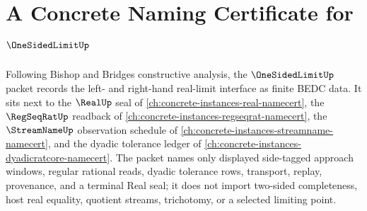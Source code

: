 \chapter{A Concrete Naming Certificate for $\OneSidedLimitUp$}
\label{ch:concrete-instances-one-sided-limit-namecert}

Following Bishop and Bridges constructive analysis, the $\OneSidedLimitUp$ packet records the left- and right-hand real-limit interface as finite BEDC data. It sits next to the $\RealUp$ seal of \autoref{ch:concrete-instances-real-namecert}, the $\RegSeqRatUp$ readback of \autoref{ch:concrete-instances-regseqrat-namecert}, the $\StreamNameUp$ observation schedule of \autoref{ch:concrete-instances-streamname-namecert}, and the dyadic tolerance ledger of \autoref{ch:concrete-instances-dyadicratcore-namecert}. The packet names only displayed side-tagged approach windows, regular rational reads, dyadic tolerance rows, transport, replay, provenance, and a terminal Real seal; it does not import two-sided completeness, host real equality, quotient streams, trichotomy, or a selected limiting point.

